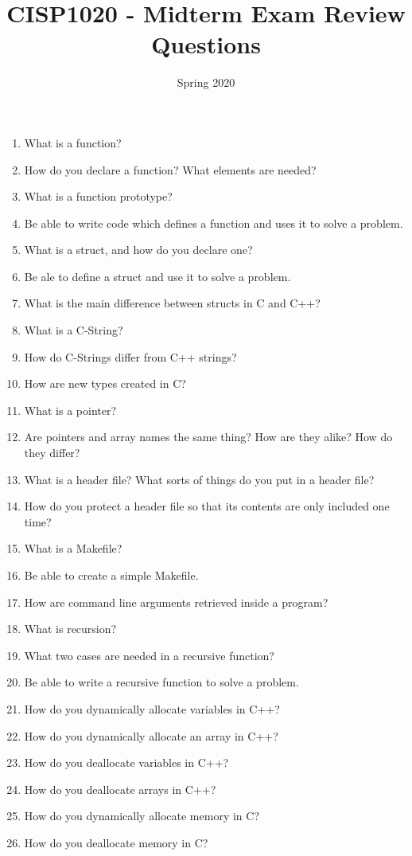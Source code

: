 \documentclass{article}
\title{CISP1020 - Midterm Exam Review Questions}
\date{Spring 2020}
\begin{document}
\maketitle
\begin{enumerate}
\item What is a function?
\item How do you declare a function? What elements are needed?
\item What is a function prototype?
\item Be able to write code which defines a function and uses it to
solve a problem.
\item What is a struct, and how do you declare one?
\item Be ale to define a struct and use it to solve a problem.
\item What is the main difference between structs in C and C++?
\item What is a C-String?
\item How do C-Strings differ from C++ strings?
\item How are new types created in C?
\item What is a pointer?
\item Are pointers and array names the same thing?  How are they
alike? How do they differ?
\item What is a header file? What sorts of things do you put in
a header file?
\item How do you protect a header file so that its contents are only
included one time?
\item What is a Makefile?
\item Be able to create a simple Makefile.
\item How are command line arguments retrieved inside a program?
\item What is recursion?
\item What two cases are needed in a recursive function?
\item Be able to write a recursive function to solve a problem.
\item How do you dynamically allocate variables in C++?
\item How do you dynamically allocate an array in C++?
\item How do you deallocate variables in C++?
\item How do you deallocate arrays in C++?
\item How do you dynamically allocate memory in C?
\item How do you deallocate memory in C?

\end{enumerate}
\end{document}
